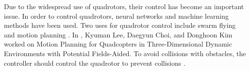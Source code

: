 \documentclass[conference]{IEEEtran}
\begin{document}
Due to the widespread use of quadrotors, their control has become an important issue.
In order to control quadrotors, neural networks \cite{b9} and machine learning \cite{b10} methods have been used.
Two uses for quadrotor control include swarm flying \cite{b12} and motion planning \cite{b11}.
In \cite{b13}, Kyuman Lee, Daegyun Choi, and Donghoon Kim worked on  Motion Planning for Quadcopters in Three-Dimensional Dynamic Environments with Potential Fields-Aided.
To avoid collisions with obstacles, the controller should control the quadrotor to prevent collisions \cite{b14}.
\end{document}
